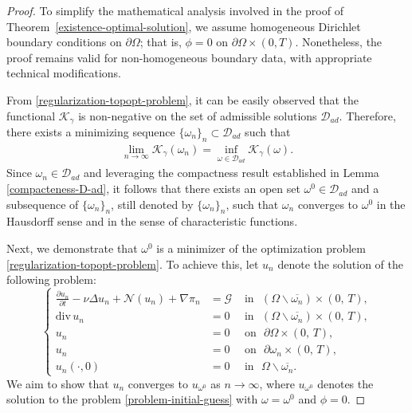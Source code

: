 \documentclass[a4paper,12pt,reqno,natbib]{amsart}
\def\K{\mathcal K}
\def\N{\mathcal N}
\begin{document}
\begin{proof}To simplify the mathematical analysis involved in the proof of Theorem~\ref{existence-optimal-solution}, we assume homogeneous Dirichlet boundary conditions on $\partial\Omega$; that is, $\phi = 0$ on $\partial\Omega \times (0,T)$. Nonetheless, the proof remains valid for non-homogeneous boundary data, with appropriate technical modifications.


From \eqref{regularization-topopt-problem}, it can be easily observed that the functional $\K_\gamma$ is non-negative on the set of admissible solutions $\mathcal{D}_{ad}$. Therefore, there exists a minimizing sequence $\{\omega_n\}_n\subset\mathcal{D}_{ad}$ such that
\begin{align*}
\lim_{n\rightarrow\infty}\K_\gamma(\omega_n)=\inf_{\omega\in\mathcal{D}_{ad}}\K_\gamma(\omega).
\end{align*}
Since $\omega_n \in \mathcal{D}_{ad}$ and leveraging the compactness result established in Lemma \ref{compacteness-D-ad}, it follows that there exists an open set $\omega^0 \in \mathcal{D}_{ad}$ and a subsequence of $\{\omega_n\}_{n}$, still denoted by $\{\omega_n\}_{n}$, such that $\omega_n$ converges to $\omega^0$ in the Hausdorff sense and in the sense of
characteristic functions.


Next, we demonstrate that $\omega^0$ is a minimizer of the optimization problem \eqref{regularization-topopt-problem}. To achieve this, let $u_n$ denote the solution of the following problem:
\begin{equation}\label{problem-u-n}
\left\{
\begin{array}{rll}
\displaystyle \frac {\partial u_n}{\partial t}-\nu
\Delta u_n+ \N(u_n)+ \nabla \pi_n
 &= \mathcal{G} &\mbox{ in }  \,\,(\Omega\backslash\overline{\omega_n})\times (0,\,T) ,\\
\mbox{div}\, u_n &=  0 & \mbox{ in } \,\, (\Omega\backslash\overline{\omega_n}) \times (0,\,T) ,\\
u_n &= 0 & \mbox{ on }\,\,  \partial\Omega \times (0,\,T) , \\
u_n &=  0 & \mbox{ on } \,\, \partial\omega_n \times (0,\,T) ,\\
u_n(\cdot,0)&= 0&\mbox{ in } \,\,  \Omega\backslash\overline{\omega_n}.
\end{array}
 \right.
\end{equation}
We aim to show that $u_n$ converges to $u_{\omega^0}$ as $n\to\infty$, where \( u_{\omega^0} \) denotes the solution to the problem \eqref{problem-initial-guess} with \( \omega = \omega^0 \) and \( \phi = 0 \).


\end{proof}
\end{document}
